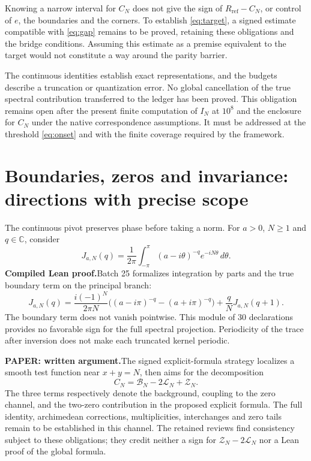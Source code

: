 \documentclass[11pt,a4paper]{article}
\theoremstyle{remark}
\newcommand{\C}{\mathbb C}
\newcommand{\paid}{\textbf{Compiled Lean proof.}\space}
\newcommand{\paper}{\textbf{PAPER: written argument.}\space}
\begin{document}
Knowing a narrow interval for $C_N$ does not give the sign
of $R_{\mathrm{ref}}-C_N$, or control of $e$, the boundaries and the corners.
To establish \eqref{eq:target}, a signed estimate
compatible with \eqref{eq:gap} remains to be proved, retaining these obligations and the
bridge conditions. Assuming this estimate as a premise equivalent to
the target would not constitute a way around the parity barrier.

The continuous identities establish exact representations, and the
budgets describe a truncation or quantization error. No
global cancellation of the true spectral contribution transferred to the
ledger has been proved. This obligation remains open after the present
finite computation of $I_N$ at $10^8$ and the enclosure for $C_N$ under the
native correspondence assumptions. It must be addressed at the
threshold \eqref{eq:onset} and with the finite coverage required by the framework.

\clearpage
\section{Boundaries, zeros and invariance: directions with precise scope}\label{sec:strategy}
The continuous pivot preserves phase before taking a norm. For
$a>0$, $N\ge1$ and $q\in\C$, consider
\[
J_{a,N}(q)=\frac1{2\pi}\int_{-\pi}^{\pi}
(a-i\theta)^{-q}e^{-iN\theta}\,d\theta.
\]
\paid Batch 25 formalizes integration by parts and the true boundary term
on the principal branch:
\begin{equation}\label{eq:bord}
J_{a,N}(q)=\frac{i(-1)^N}{2\pi N}
\bigl((a-i\pi)^{-q}-(a+i\pi)^{-q}\bigr)
+\frac qN J_{a,N}(q+1).
\end{equation}
The boundary term does not vanish pointwise. This module of 30 declarations
provides no favorable sign for the full spectral projection.
Periodicity of the trace after inversion does not make
each truncated kernel periodic.

\paper The signed explicit-formula strategy localizes a smooth test
function near $x+y=N$, then aims for the decomposition
\[
C_N=\mathcal B_N-2\mathcal L_N+\mathcal Z_N.
\]
The three terms respectively denote the background, coupling to the
zero channel, and the two-zero contribution in the proposed explicit formula.
The full identity, archimedean corrections, multiplicities,
interchanges and zero tails remain to be established in this channel.
The retained reviews find consistency subject to these obligations; they
credit neither a sign for $\mathcal Z_N-2\mathcal L_N$ nor a
Lean proof of the global formula.
\end{document}
